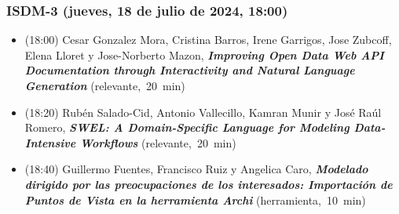 \begin{frame}
  \frametitle{ISDM-3 (jueves, 18 de julio de 2024, 18:00)}
\begin{itemize}


\item {(18:00) Cesar Gonzalez Mora, Cristina Barros, Irene Garrigos, Jose Zubcoff, Elena Lloret y Jose-Norberto Mazon}, %
      {\bfseries\itshape Improving Open Data Web API Documentation through Interactivity and Natural Language Generation} %
      {(relevante,~20~min)}
      

\item {(18:20) Rubén Salado-Cid, Antonio Vallecillo, Kamran Munir y José Raúl Romero}, %
      {\bfseries\itshape SWEL: A Domain-Specific Language for Modeling Data-Intensive Workflows} %
      {(relevante,~20~min)}
      

\item {(18:40) Guillermo Fuentes, Francisco Ruiz y Angelica Caro}, %
      {\bfseries\itshape Modelado dirigido por las preocupaciones de los interesados: Importación de Puntos de Vista en la herramienta Archi} %
      {(herramienta,~10~min)}
      

\end{itemize}
\end{frame}